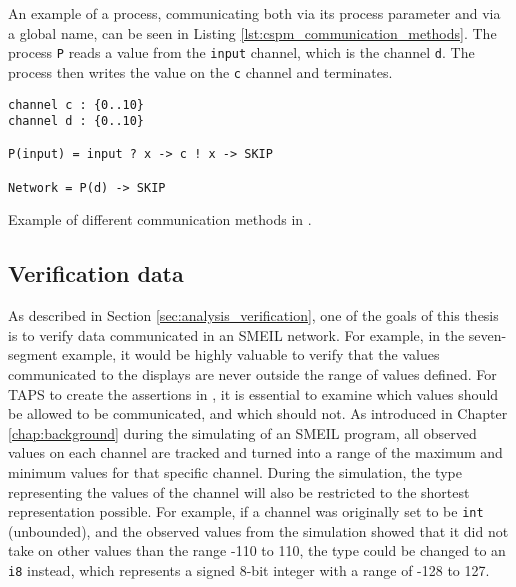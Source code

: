 An example of a \cspm{} process, communicating both via its process parameter and via a global name, can be seen in Listing \ref{lst:cspm_communication_methods}. The process \texttt{P} reads a value from the \texttt{input} channel, which is the channel \texttt{d}. The process then writes the value on the \texttt{c} channel and terminates.
\begin{listing}
\begin{verbatim}
channel c : {0..10}
channel d : {0..10}

P(input) = input ? x -> c ! x -> SKIP

Network = P(d) -> SKIP
\end{verbatim}
\caption{Example of different communication methods in \cspm{}.}
\label{lst:cspm_communication_methods}
\end{listing}
\subsection{Verification data}
As described in Section \ref{sec:analysis_verification}, one of the goals of this thesis is to verify data communicated in an SMEIL network. For example, in the seven-segment example, it would be highly valuable to verify that the values communicated to the displays are never outside the range of values defined. For TAPS to create the assertions in \cspm{}, it is essential to examine which values should be allowed to be communicated, and which should not.
As introduced in Chapter \ref{chap:background} during the simulating of an SMEIL program, all observed values on each channel are tracked and turned into a range of the maximum and minimum values for that specific channel. During the simulation, the type representing the values of the channel will also be restricted to the shortest representation possible. For example, if a channel was originally set to be \texttt{int} (unbounded), and the observed values from the simulation showed that it did not take on other values than the range -110 to 110, the type could be changed to an \texttt{i8} instead, which represents a signed 8-bit integer with a range of -128 to 127.\\


